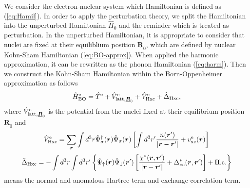 We consider the electron-nuclear system which Hamiltonian is defined as (\ref{eq:Hamil}).
In order to apply the perturbation theory, we split the Hamiltonian into the unperturbed
Hamiltonian $\hat{H}_0$ and the reminder which is treated as perturbation.
In the unperturbed Hamiltonian, it is appropriate to consider that nuclei are fixed at their
equiliblium position $\underline{{\bm R}}_0$, which are defined by nuclear 
Kohn-Sham Hamiltonian (\ref{eq:BO-approx}). When applied the harmonic approximation,
it can be rewritten as the phonon Hamiltonian (\ref{eq:harm}).
%
Then we construct the Kohn-Sham Hamiltonian within the Born-Oppenheimer approximation as follows
%
\begin{equation}
	\hat{H}^{\rm e}_{\rm BO} = \hat{T}^{\rm e} + \hat{V}^{\rm e}_{{\rm latt},\underline{{\bm R}}_0}
	+ \hat{V}^{\rm e}_{\rm Hxc} + \hat{\Delta}_{\rm Hxc},
	\label{eq:BO-KS}
\end{equation}
%
where $\hat{V}^{\rm e}_{{\rm latt},\underline{\bm R}_0}$ is the potential from the nuclei fixed at their
equilibrium position $\underline{\bm R}_0$ and 
%
\begin{equation}
	\hat{V}^{\rm e}_{\rm Hxc} = \sum_{\sigma}\int d^3r\hat{\Psi}^{\dag}_{\sigma}({\bm r})
	\hat{\Psi}_{\sigma}({\bm r}) 
	\left[
		\int d^3r' \frac{n({\bm r'})}{|{\bm r}-{\bm r'}|} + v^{\rm e}_{\rm xc}(\bm r)
	\right]
\end{equation}
%
\begin{equation}
\begin{split}
	\hat{\Delta}_{\rm Hxc} = -\int d^3r \int d^3r'
	\left\{
		\hat{\Psi}_\uparrow({\bm r})\hat{\Psi}_\downarrow({\bm r'})
		\left[
			\frac{\chi^\ast({\bm r}, {\bm r'})}{|{\bm r}-{\bm r'}|} 
			+ \Delta^\ast_{\rm xc}({\bm r}, {\bm r'})
		\right]
		+ {\rm H.c.}
	\right\}
	\label{eq:DeltaHxc}
\end{split}
\end{equation}
%
means the normal and anomalous Hartree term and exchange-correlation term.

